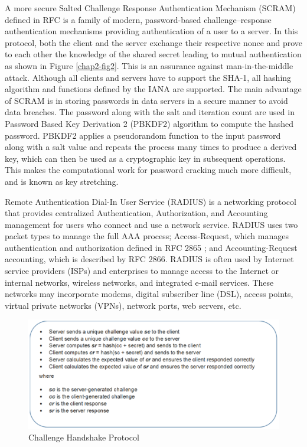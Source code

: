 \begin{multicols}{2}
A more secure Salted Challenge Response Authentication Mechanism (SCRAM) defined in RFC \cite{chap2-key7} is a family of modern, password-based challenge--response authentication mechanisms providing authentication of a user to a server. In this protocol, both the client and the server exchange their respective nonce and prove to each other the knowledge of the shared secret leading to mutual authentication as shown in Figure \ref{chap2-fig2}. This is an assurance against man-in-the-middle attack. Although all clients and servers have to support the SHA-1, all hashing algorithm and functions defined by the IANA are supported. The main advantage of SCRAM is in storing passwords in data servers in a secure manner to avoid data breaches. The password along with the salt and iteration count are used in Password Based Key Derivation 2 (PBKDF2) algorithm to compute the hashed password. PBKDF2 applies a pseudorandom function to the input password along with a salt value and repeats the process many times to produce a derived key, which can then be used as a cryptographic key in subsequent operations. This makes the computational work for password cracking much more difficult, and is known as key stretching.

Remote Authentication Dial-In User Service (RADIUS) is a networking protocol that provides centralized Authentication, Authorization, and Accounting management for users who connect and use a network service. RADIUS uses two packet types to manage the full AAA process; Access-Request, which manages authentication and authorization defined in RFC 2865 \cite{chap2-key8}; and Accounting-Request accounting, which is described by RFC 2866. RADIUS is often used by Internet service providers (ISPs) and enterprises to manage access to the Internet or internal networks, wireless networks, and integrated e-mail services. These networks may incorporate modems, digital subscriber line (DSL), access points, virtual private networks (VPNs), network ports, web servers, etc.
\end{multicols}

\begin{figure}[!ht]
\centering
\includegraphics{src/Figures/chap2/1.eps}
\caption{Challenge Handshake Protocol}\label{chap2-fig1}
\end{figure}

